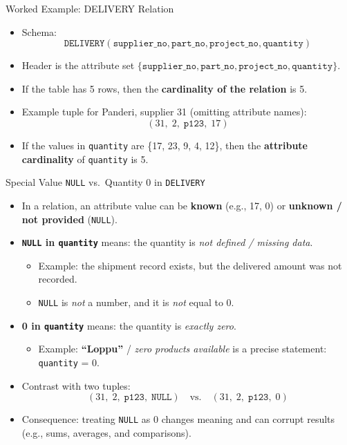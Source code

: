 \documentclass[10pt,aspectratio=169]{beamer}
\begin{document}
\begin{frame}{Worked Example: DELIVERY Relation}
\small
\begin{itemize}
  \item Schema:
  \[
    \texttt{DELIVERY}(\texttt{supplier\_no},\texttt{part\_no},\texttt{project\_no},\texttt{quantity})
  \]
  \item Header is the attribute set
  $\{\texttt{supplier\_no},\texttt{part\_no},\texttt{project\_no},\texttt{quantity}\}$.
  \item If the table has 5 rows, then the \textbf{cardinality of the relation} is 5.
  \item Example tuple for Panderi, supplier 31 (omitting attribute names):
  \[
    (31,\;2,\;\texttt{p123},\;17)
  \]
  \item If the values in \texttt{quantity} are \{17, 23, 9, 4, 12\}, then the \textbf{attribute cardinality} of \texttt{quantity} is 5.
\end{itemize}
\end{frame}
\begin{frame}{Special Value \texttt{NULL} vs.\ Quantity 0 in \texttt{DELIVERY}}
\small
\begin{itemize}
  \item In a relation, an attribute value can be \textbf{known} (e.g., 17, 0) or \textbf{unknown / not provided} (\texttt{NULL}).
  \item \textbf{\texttt{NULL} in \texttt{quantity}} means: the quantity is \emph{not defined / missing data}.
    \begin{itemize}
      \item Example: the shipment record exists, but the delivered amount was not recorded.
      \item \texttt{NULL} is \emph{not} a number, and it is \emph{not} equal to 0.
    \end{itemize}
  \item \textbf{0 in \texttt{quantity}} means: the quantity is \emph{exactly zero}.
    \begin{itemize}
      \item Example: \textbf{``Loppu''} / \emph{zero products available} is a precise statement: \texttt{quantity} = 0.
    \end{itemize}

  \item Contrast with two tuples:
  \[
    (31,\;2,\;\texttt{p123},\;\texttt{NULL}) \quad\text{vs.}\quad (31,\;2,\;\texttt{p123},\;0)
  \]
  \item Consequence: treating \texttt{NULL} as 0 changes meaning and can corrupt results
        (e.g., sums, averages, and comparisons).
\end{itemize}
\end{frame}
\end{document}
